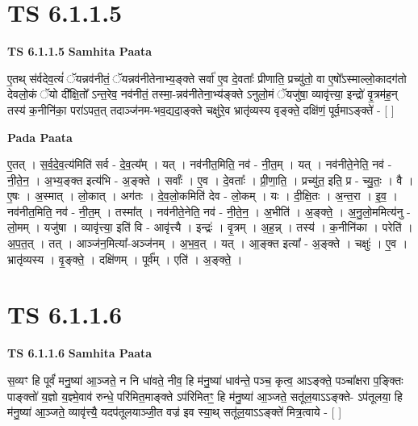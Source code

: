 \documentclass[17pt]{extarticle}
\begin{document}
\section*{ TS 6.1.1.5 }

\textbf{TS 6.1.1.5 } \newline
\textbf{Samhita Paata} \newline

ए॒तथ् स॑र्वदेव॒त्यं॑ ॅयन्नव॑नीतं॒ ॅयन्नव॑नीतेनाभ्य॒ङ्क्ते सर्वा॑ ए॒व दे॒वताः᳚ प्रीणाति॒ प्रच्यु॑तो॒ वा ए॒षो᳚ऽस्माल्लो॒कादग॑तो देवलो॒कं ॅयो दी᳚क्षि॒तो᳚ ऽन्त॒रेव॒ नव॑नीतं॒ तस्मा॒-न्नव॑नीतेना॒भ्य॑ङ्क्ते ऽनुलो॒मं ॅयजु॑षा॒ व्यावृ॑त्त्या॒ इन्द्रो॑ वृ॒त्रम॑ह॒न् तस्य॑ क॒नीनि॑का॒ परा॑ऽपत॒त् तदाञ्ज॑नम-भव॒द्यदा॒ङ्क्ते चक्षु॑रे॒व भ्रातृ॑व्यस्य वृङ्क्ते॒ दक्षि॑णं॒ पूर्व॒माऽङ्क्ते॑ - [  ] \newline

\textbf{Pada Paata} \newline

ए॒तत् । स॒र्व॒दे॒व॒त्य॑मिति॑ सर्व - दे॒व॒त्य᳚म् । यत् । नव॑नीत॒मिति॒ नव॑ - नी॒त॒म् । यत् । नव॑नीते॒नेति॒ नव॑ - नी॒ते॒न॒ । अ॒भ्य॒ङ्क्त इत्य॑भि - अ॒ङ्क्ते । सर्वाः᳚ । ए॒व । दे॒वताः᳚ । प्री॒णा॒ति॒ । प्रच्यु॑त॒ इति॒ प्र - च्यु॒तः॒ । वै । ए॒षः । अ॒स्मात् । लो॒कात् । अग॑तः । दे॒व॒लो॒कमिति॑ देव - लो॒कम् । यः । दी॒क्षि॒तः । अ॒न्त॒रा । इ॒व॒ । नव॑नीत॒मिति॒ नव॑ - नी॒त॒म् । तस्मा᳚त् । नव॑नीते॒नेति॒ नव॑ - नी॒ते॒न॒ । अ॒भीति॑ । अ॒ङ्क्ते॒ । अ॒नु॒लो॒ममित्य॑नु - लो॒मम् । यजु॑षा । व्यावृ॑त्त्या॒ इति॑ वि - आवृ॑त्त्यै । इन्द्रः॑ । वृ॒त्रम् । अ॒ह॒न्न् । तस्य॑ । क॒नीनि॑का । परेति॑ । अ॒प॒त॒त् । तत् । आञ्ज॑न॒मित्या᳚-अञ्ज॑नम् । अ॒भ॒व॒त् । यत् । आ॒ङ्क्त इत्या᳚ - अ॒ङ्क्ते । चक्षुः॑ । ए॒व । भ्रातृ॑व्यस्य । वृ॒ङ्क्ते॒ । दक्षि॑णम् । पूर्व᳚म् । एति॑ । अ॒ङ्क्ते॒ ।  \newline




\section*{ TS 6.1.1.6 }

\textbf{TS 6.1.1.6 } \newline
\textbf{Samhita Paata} \newline

स॒व्यꣳ हि पूर्वं॑ मनु॒ष्या॑ आ॒ञ्जते॒ न नि धा॑वते॒ नीव॒ हि म॑नु॒ष्या॑ धाव॑न्ते॒ पञ्च॒ कृत्व॒ आऽङ्क्ते॒ पञ्चा᳚क्षरा प॒ङ्क्तिः पाङ्क्तो॑ य॒ज्ञो य॒ज्ञ्मे॒वाव॑ रुन्धे॒ परि॑मित॒माङ्क्ते ऽप॑रिमितꣳ॒॒ हि म॑नु॒ष्या॑ आ॒ञ्जते॒ सतू॑ल॒याऽऽङ्क्ते- ऽप॑तूलया॒ हि म॑नु॒ष्या॑ आ॒ञ्जते॒ व्यावृ॑त्त्यै॒ यदप॑तूलयाञ्जी॒त वज्र॑ इव स्या॒थ् सतू॑ल॒याऽऽङ्क्ते॑ मित्र॒त्वाये - [  ] \newline
\end{document}
